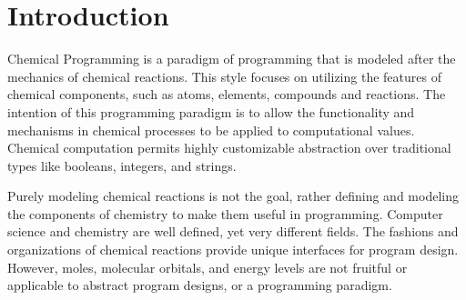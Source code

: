 
\section{Introduction}

\par Chemical Programming is a paradigm of programming that is modeled after the mechanics of chemical reactions. This style focuses on utilizing the features of chemical components, such as atoms, elements, compounds and reactions. The intention of this programming paradigm is to allow the functionality and mechanisms in chemical processes to be applied to computational values. Chemical computation permits highly customizable abstraction over traditional types like booleans, integers, and strings.
\par Purely modeling chemical reactions is not the goal, rather defining and modeling the components of chemistry to make them useful in programming. Computer science and chemistry are well defined, yet very different fields. The fashions and organizations of chemical reactions provide unique interfaces for program design. However, moles, molecular orbitals, and energy levels are not fruitful or applicable to abstract program designs, or a programming paradigm.